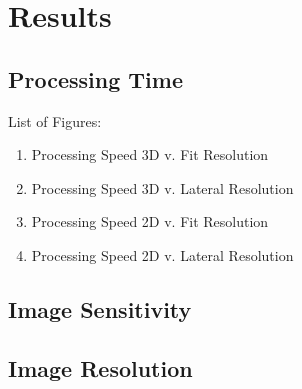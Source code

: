 \chapter{Results}

\section{Processing Time}
List of Figures:
\begin{enumerate}
\item Processing Speed 3D v. Fit Resolution
\item Processing Speed 3D v. Lateral Resolution
\item Processing Speed 2D v. Fit Resolution
\item Processing Speed 2D v. Lateral Resolution
\end{enumerate}

\section{Image Sensitivity}

\section{Image Resolution}
